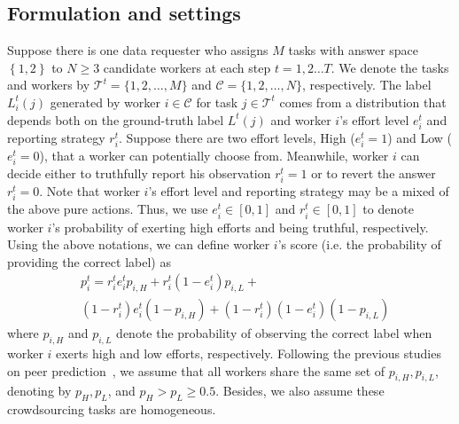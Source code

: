\documentclass{article}
\begin{document}
\subsection{Formulation and settings}
Suppose there is one data requester who assigns $M$ tasks with answer space $\left\{1,2\right\}$ to $N \geq 3$ candidate workers at each step $t=1,2\ldots T$.
We denote the tasks and workers by $\mathcal{T}^{t}=\{1,2,\ldots,M\}$ and $\mathcal{C}=\{1,2,\ldots,N\}$, respectively.
The label $L^{t}_{i}(j)$ generated by worker $i\in \mathcal{C}$ for task $j\in\mathcal{T}^{t}$ comes from a distribution that depends both on the ground-truth label $L^{t}(j)$ and worker $i$'s effort level $e^{t}_i$ and reporting strategy $r^{t}_i$.
Suppose there are two effort levels, High ($e^{t}_i=1$) and Low ($e^{t}_i=0$), that a worker can potentially choose from.
Meanwhile, worker $i$ can decide either to truthfully report his observation $r^{t}_i = 1$ or to revert the answer $r^{t}_i = 0$.
Note that worker $i$'s effort level and reporting strategy may be a mixed of the above pure actions.
Thus, we use $e^{t}_i\in[0,1]$ and $r^{t}_i\in[0,1]$ to denote worker $i$'s probability of exerting high efforts and being truthful, respectively.
Using the above notations, we can define worker $i$'s score (i.e. the probability of providing the correct label)  as
\begin{equation}
\begin{split}
&p^{t}_i=r^{t}_i e^{t}_i p_{i, H}+r^{t}_i (1-e^{t}_i) p_{i, L}+\\
&(1-r^{t}_i) e^{t}_i (1-p_{i, H})+(1-r^{t}_i) (1-e^{t}_i) (1-p_{i, L})
\end{split}
\end{equation}
where $p_{i, H}$ and $p_{i, L}$ denote the probability of observing the correct label when worker $i$ exerts high and low efforts, respectively.
Following the previous studies on peer prediction~\cite{dasgupta2013crowdsourced,liu2017sequential}, we assume that all workers share the same set of $p_{i, H}, p_{i, L}$, denoting by $p_H, p_L$, and $p_{H}>p_{L}\geq 0.5$.
Besides, we also assume these crowdsourcing tasks are homogeneous.
\end{document}
